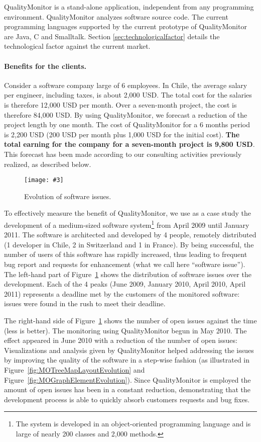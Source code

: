 \documentclass[runningheads]{llncs}
\newcommand{\fig}[4]{
	\begin{figure}[#1]
		\centering
		\texttt{[image: \#3]}
		\caption{\label{fig:#3}#4}
	\end{figure}}
\newcommand{\secref}[1]{Section \ref{sec:#1}}
\newcommand{\figref}[1]{Figure~\ref{fig:#1}}
\begin{document}
QualityMonitor is a stand-alone application, independent from any programming environment. QualityMonitor analyzes software source code. The current programming languages supported by the current prototype of QualityMonitor are Java, C and Smalltalk. \secref{technologicalfactor} details the technological factor against the current market.

\paragraph{Benefits for the clients.} Consider a software company large of 6 employees. In Chile, the average salary per engineer, including taxes, is about 2,000 USD. The total cost for the salaries is therefore 12,000 USD per month. Over a seven-month project, the cost is therefore 84,000 USD. By using QualityMonitor, we forecast a reduction of the project length by one month. The cost of QualityMonitor for a 6 months period is 2,200 USD (200 USD per month plus 1,000 USD for the initial cost). \textbf{The total earning for the company for a seven-month project is 9,800 USD}. This forecast has been made according to our consulting activities previously realized, as described below.

\fig{}{1}{BugReductions}{Evolution of software issues.}

To effectively measure the benefit of QualityMonitor, we use as a case study the development of a medium-sized software system\footnote{The system is developed in an object-oriented programming language and is large of nearly 200 classes and 2,000 methods.} from April 2009 until January 2011. The software is architected and developed by 4 people, remotely distributed (1 developer in Chile, 2 in Switzerland and 1 in France). By being successful, the number of users of this software has rapidly increased, thus leading to frequent bug report and requests for enhancement (what we call here ``software issue''). The left-hand part of \figref{BugReductions} shows the distribution of software issues over the development. Each of the 4 peaks (June 2009, January 2010, April 2010, April 2011) represents a deadline met by the customers of the monitored software: issues were found in the rush to meet their deadline. 

The right-hand side of \figref{BugReductions} shows the number of open issues against the time (less is better). The monitoring using QualityMonitor begun in May 2010. The effect appeared in June 2010 with a reduction of the number of open issues: Visualizations and analysis given by QualityMonitor helped addressing the issues by improving the quality of the software in a step-wise fashion (as illustrated in \figref{MOTreeMapLayoutEvolution} and \figref{MOGraphElementEvolution}). Since QualityMonitor is employed the amount of open issues has been in a constant reduction, demonstrating that the development process is able to quickly absorb customers requests and bug fixes.
\end{document}
